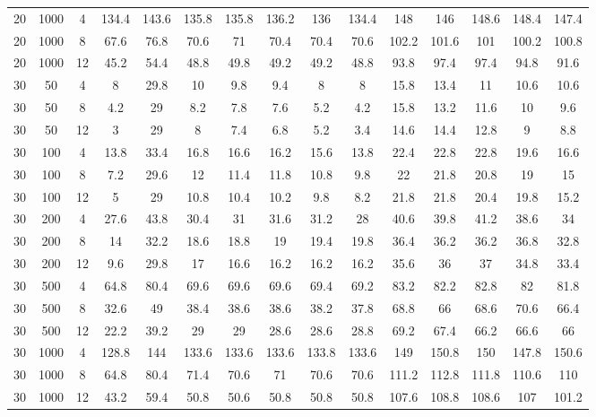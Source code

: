 \documentclass[review,3p,times,authoryear,12pt]{elsarticle}
\begin{document}
\begin{table}[!htbp]
\begin{tabular}{ccccccccccccccc}
    20    & 1000  & 4     & 134.4 & 143.6 & 135.8 & 135.8 & 136.2 & 136   & 134.4 & 148   & 146   & 148.6 & 148.4 & 147.4 \\
    20    & 1000  & 8     & 67.6  & 76.8  & 70.6  & 71    & 70.4  & 70.4  & 70.6  & 102.2 & 101.6 & 101   & 100.2 & 100.8 \\
    20    & 1000  & 12    & 45.2  & 54.4  & 48.8  & 49.8  & 49.2  & 49.2  & 48.8  & 93.8  & 97.4  & 97.4  & 94.8  & 91.6 \\
    30    & 50    & 4     & 8     & 29.8  & 10    & 9.8   & 9.4   & 8     & 8     & 15.8  & 13.4  & 11    & 10.6  & 10.6 \\
    30    & 50    & 8     & 4.2   & 29    & 8.2   & 7.8   & 7.6   & 5.2   & 4.2   & 15.8  & 13.2  & 11.6  & 10    & 9.6 \\
    30    & 50    & 12    & 3     & 29    & 8     & 7.4   & 6.8   & 5.2   & 3.4   & 14.6  & 14.4  & 12.8  & 9     & 8.8 \\
    30    & 100   & 4     & 13.8  & 33.4  & 16.8  & 16.6  & 16.2  & 15.6  & 13.8  & 22.4  & 22.8  & 22.8  & 19.6  & 16.6 \\
    30    & 100   & 8     & 7.2   & 29.6  & 12    & 11.4  & 11.8  & 10.8  & 9.8   & 22    & 21.8  & 20.8  & 19    & 15 \\
    30    & 100   & 12    & 5     & 29    & 10.8  & 10.4  & 10.2  & 9.8   & 8.2   & 21.8  & 21.8  & 20.4  & 19.8  & 15.2 \\
    30    & 200   & 4     & 27.6  & 43.8  & 30.4  & 31    & 31.6  & 31.2  & 28    & 40.6  & 39.8  & 41.2  & 38.6  & 34 \\
    30    & 200   & 8     & 14    & 32.2  & 18.6  & 18.8  & 19    & 19.4  & 19.8  & 36.4  & 36.2  & 36.2  & 36.8  & 32.8 \\
    30    & 200   & 12    & 9.6   & 29.8  & 17    & 16.6  & 16.2  & 16.2  & 16.2  & 35.6  & 36    & 37    & 34.8  & 33.4 \\
    30    & 500   & 4     & 64.8  & 80.4  & 69.6  & 69.6  & 69.6  & 69.4  & 69.2  & 83.2  & 82.2  & 82.8  & 82    & 81.8 \\
    30    & 500   & 8     & 32.6  & 49    & 38.4  & 38.6  & 38.6  & 38.2  & 37.8  & 68.8  & 66    & 68.6  & 70.6  & 66.4 \\
    30    & 500   & 12    & 22.2  & 39.2  & 29    & 29    & 28.6  & 28.6  & 28.8  & 69.2  & 67.4  & 66.2  & 66.6  & 66 \\
    30    & 1000  & 4     & 128.8 & 144   & 133.6 & 133.6 & 133.6 & 133.8 & 133.6 & 149   & 150.8 & 150   & 147.8 & 150.6 \\
    30    & 1000  & 8     & 64.8  & 80.4  & 71.4  & 70.6  & 71    & 70.6  & 70.6  & 111.2 & 112.8 & 111.8 & 110.6 & 110 \\
    30    & 1000  & 12    & 43.2  & 59.4  & 50.8  & 50.6  & 50.8  & 50.8  & 50.8  & 107.6 & 108.8 & 108.6 & 107   & 101.2 \\

    \hline
    \end{tabular}
  \label{tab:3}
\end{table}
\end{document}
